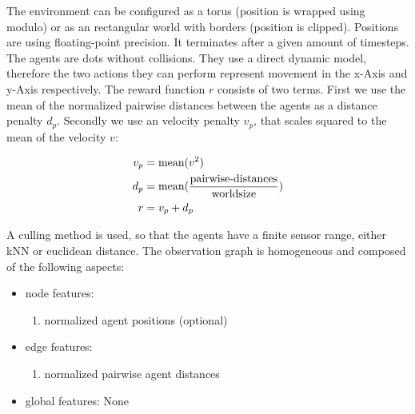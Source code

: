 The environment can be configured as a torus (position is wrapped using modulo) or as an rectangular world with borders (position is clipped). Positions are using floating-point precision. It terminates after a given amount of timesteps.
The agents are dots without collisions. They use a direct dynamic model, therefore the two actions they can perform represent movement in the x-Axis and y-Axis respectively.
The reward function $r$ consists of two terms. First we use the mean of the normalized pairwise distances between the agents as a distance penalty $d_p$. Secondly we use an velocity penalty $v_p$, that scales squared to the mean of the velocity $v$:

\begin{equation}
    \begin{aligned}
        v_p &= \textup{mean}(v^2)\\
        d_p &= \textup{mean}(\frac{\textup{pairwise-distances}}{\textup{worldsize}}) \\
        r &= v_p + d_p
    \end{aligned}
    \nonumber
\end{equation}

A culling method is used, so that the agents have a finite sensor range, either kNN or euclidean distance. The observation graph is homogeneous and composed of the following aspects:
\begin{itemize}[noitemsep,nolistsep]
    \item node features:
    \begin{enumerate}
        \item normalized agent positions (optional)
    \end{enumerate} 
    \item edge features:
    \begin{enumerate}
        \item normalized pairwise agent distances
    \end{enumerate} 
    \item global features: None
\end{itemize}



